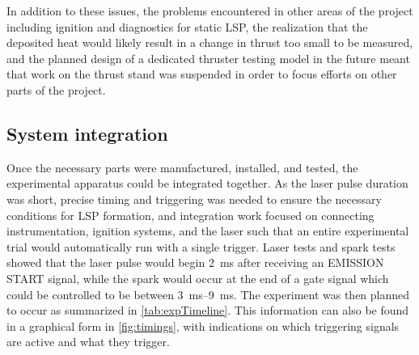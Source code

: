                 In addition to these issues, the problems encountered in other areas of the project including ignition and diagnostics for static LSP, the realization that the deposited heat would likely result in a change in thrust too small to be measured, and the planned design of a dedicated thruster testing model in the future meant that work on the thrust stand was suspended in order to focus efforts on other parts of the project.

        \subsection{System integration}
                Once the necessary parts were manufactured, installed, and tested, the experimental apparatus could be integrated together. As the laser pulse duration was short, precise timing and triggering was needed to ensure the necessary conditions for LSP formation, and integration work focused on connecting instrumentation, ignition systems, and the laser such that an entire experimental trial would automatically run with a single trigger. Laser tests and spark tests showed that the laser pulse would begin \qty{2}{ms} after receiving an EMISSION START signal, while the spark would occur at the end of a gate signal which could be controlled to be between \qtyrange{3}{9}{ms}. The experiment was then planned to occur as summarized in \autoref{tab:expTimeline}. This information can also be found in a graphical form in \autoref{fig:timings}, with indications on which triggering signals are active and what they trigger.

